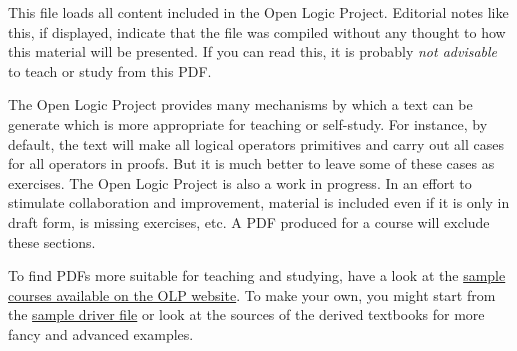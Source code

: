 \documentclass[../include/open-logic-part]{subfiles}
\begin{document}
\clearpage

\begin{editorial}
This file loads all content included in the Open Logic Project.
Editorial notes like this, if displayed, indicate that the file was
compiled without any thought to how this material will be presented.
If you can read this, it is probably \emph{not advisable} to teach or
study from this PDF. 

The Open Logic Project provides many mechanisms by which a text can be
generate which is more appropriate for teaching or self-study.  For
instance, by default, the text will make all logical operators
primitives and carry out all cases for all operators in proofs.  But
it is much better to leave some of these cases as exercises. The Open
Logic Project is also a work in progress. In an effort to stimulate
collaboration and improvement, material is included even if it is
only in draft form, is missing exercises, etc.  A PDF produced for a
course will exclude these sections.

To find PDFs more suitable for teaching and studying, have a look at
the \href{http://builds.openlogicproject.org/}{sample courses
  available on the OLP website}. To make your own, you might start
from the
\href{https://github.com/OpenLogicProject/OpenLogic/tree/master/courses/sample}{sample
  driver file} or look at the sources of the derived textbooks for
more fancy and advanced examples.
\end{editorial}



















\end{document}
